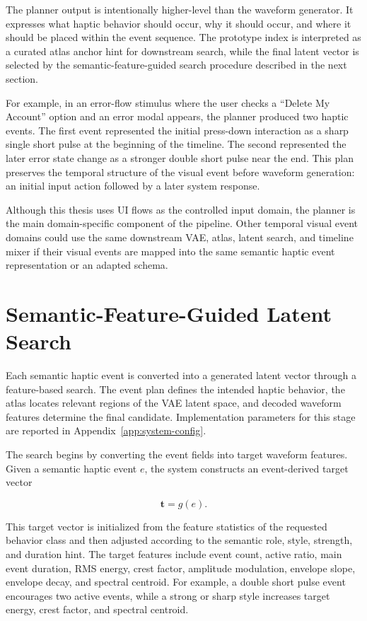 The planner output is intentionally higher-level than the waveform generator. It expresses what haptic behavior should occur, why it should occur, and where it should be placed within the event sequence. The prototype index is interpreted as a curated atlas anchor hint for downstream search, while the final latent vector is selected by the semantic-feature-guided search procedure described in the next section.

For example, in an error-flow stimulus where the user checks a ``Delete My Account'' option and an error modal appears, the planner produced two haptic events. The first event represented the initial press-down interaction as a sharp single short pulse at the beginning of the timeline. The second represented the later error state change as a stronger double short pulse near the end. This plan preserves the temporal structure of the visual event before waveform generation: an initial input action followed by a later system response.

Although this thesis uses UI flows as the controlled input domain, the planner is the main domain-specific component of the pipeline. Other temporal visual event domains could use the same downstream VAE, atlas, latent search, and timeline mixer if their visual events are mapped into the same semantic haptic event representation or an adapted schema.

\section{Semantic-Feature-Guided Latent Search}

Each semantic haptic event is converted into a generated latent vector through a feature-based search. The event plan defines the intended haptic behavior, the atlas locates relevant regions of the VAE latent space, and decoded waveform features determine the final candidate. Implementation parameters for this stage are reported in Appendix~\ref{app:system-config}.

The search begins by converting the event fields into target waveform features. Given a semantic haptic event $e$, the system constructs an event-derived target vector

\begin{equation}
\mathbf{t} = g(e).
\end{equation}

This target vector is initialized from the feature statistics of the requested behavior class and then adjusted according to the semantic role, style, strength, and duration hint. The target features include event count, active ratio, main event duration, RMS energy, crest factor, amplitude modulation, envelope slope, envelope decay, and spectral centroid. For example, a double short pulse event encourages two active events, while a strong or sharp style increases target energy, crest factor, and spectral centroid.

